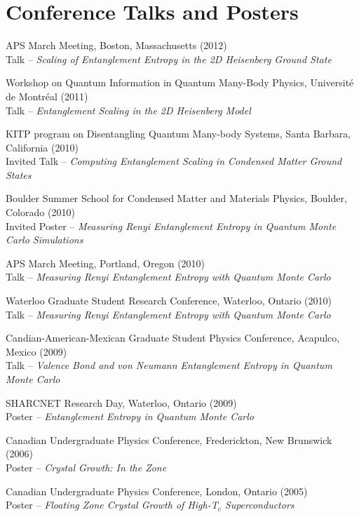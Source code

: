 \documentclass[letterpaper]{article}
\renewenvironment{itemize}{
  \begin{list}{}{
    \setlength{\leftmargin}{1.5em}
  }
}{
  \end{list}
}
\begin{document}
\section*{Conference Talks and Posters}

\begin{itemize}
\item APS March Meeting, Boston, Massachusetts (2012) \\
	Talk --  {\it Scaling of Entanglement Entropy in the 2D Heisenberg Ground State}
\item Workshop on Quantum Information in Quantum Many-Body Physics, Universit\'e de Montr\'eal  (2011) \\ Talk --  {\it Entanglement Scaling in the 2D Heisenberg Model}
\item KITP program on Disentangling Quantum Many-body Systems, Santa Barbara, California (2010) \\
 	Invited Talk -- {\it Computing Entanglement Scaling in Condensed Matter Ground States}
\item Boulder Summer School for Condensed Matter and Materials Physics, Boulder, Colorado (2010)\\
	Invited Poster -- {\it Measuring Renyi Entanglement Entropy in Quantum Monte Carlo Simulations}
\item APS March Meeting, Portland, Oregon (2010) \\
	Talk --  {\it Measuring Renyi Entanglement Entropy with Quantum Monte Carlo}
\item Waterloo Graduate Student Research Conference, Waterloo, Ontario (2010) \\
	Talk --  {\it Measuring Renyi Entanglement Entropy with Quantum Monte Carlo}
\item Candian-American-Mexican Graduate Student Physics Conference, Acapulco, Mexico (2009) \\
	Talk --  {\it Valence Bond and von Neumann Entanglement Entropy in Quantum Monte Carlo}
\item SHARCNET Research Day, Waterloo, Ontario (2009)  \\
	Poster -- {\it Entanglement Entropy in Quantum Monte Carlo}
\item Canadian Undergraduate Physics Conference, Frederickton, New Brunswick (2006)\\
	Poster -- {\it Crystal Growth: In the Zone}
\item Canadian Undergraduate Physics Conference, London, Ontario (2005)\\
	Poster -- {\it Floating Zone Crystal Growth of High-T$_c$ Superconductors}
\end{itemize}
\end{document}
